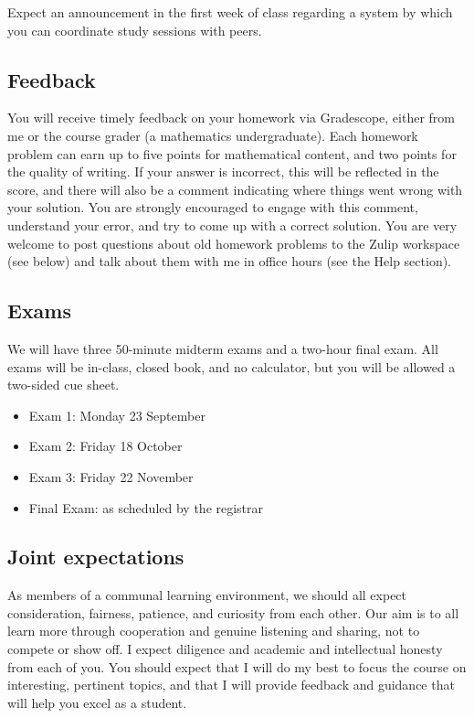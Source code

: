 \documentclass[11pt,twoside]{amsart}
\begin{document}
Expect an announcement in the first week of class regarding a system by which you can coordinate study sessions with peers.


\subsection*{Feedback}
You will receive timely feedback on your homework via Gradescope, either from me or the course grader (a mathematics undergraduate).  Each homework problem can earn up to five points for mathematical content, and two points for the quality of writing.  If your answer is incorrect, this will be reflected in the score, and there will also be a comment indicating where things went wrong with your solution.  You are strongly encouraged to engage with this comment, understand your error, and try to come up with a correct solution.  You are very welcome to post questions about old homework problems to the Zulip workspace (see below) and talk about them with me in office hours (see the Help section).



\subsection*{Exams}
We will have three 50-minute midterm exams and a two-hour final exam. All exams will be in-class, closed book, and no calculator, but you will be allowed a two-sided cue sheet.

\begin{itemize}
\item Exam 1: Monday 23 September
\item Exam 2: Friday 18 October
\item Exam 3: Friday 22 November
\item Final Exam: as scheduled by the registrar
\end{itemize}



\subsection*{Joint expectations}
As members of a communal learning environment, we should all expect consideration, fairness, patience, and curiosity from each other.  Our aim is to all learn more through cooperation and genuine listening and sharing, not to compete or show off.  I expect diligence and academic and intellectual honesty from each of you.  You should expect that I will do my best to focus the course on interesting, pertinent topics, and that I will provide feedback and guidance that will help you excel as a student.
\end{document}
